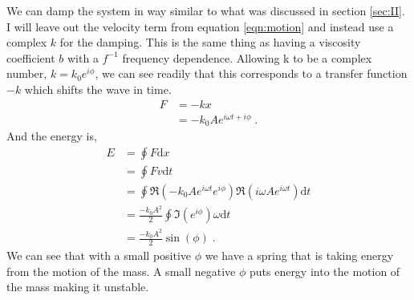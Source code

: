 We can damp the system in way similar to what was discussed in section
\ref{sec:II}. I will leave out the velocity term from equation
\ref{eqn:motion} and instead use a complex $k$ for the damping.
This is the same thing as having a viscosity coefficient $b$ with a $f^{-1}$
frequency dependence.
Allowing k to be a complex number, $k = k_0e^{i\phi}$,
we can see readily that this corresponds to a transfer function $-k$ which
shifts the wave in time.
\begin{align}
F &= -kx \nonumber \\
  &= -k_0Ae^{i\omega t + i\phi} \;.
\end{align}
And the energy is,
\begin{align}
E &= \oint F\mathrm{d}x \nonumber \\
  &= \oint Fv\mathrm{d}t \nonumber \\
  &= \oint \Re\left( -k_0Ae^{i\omega t}e^{i\phi} \right)
    \Re\left( i\omega Ae^{i\omega t} \right) \mathrm{d}t \nonumber \\
  &= \frac{-k_0A^2}{2}\oint \Im\left(e^{i\phi}\right) \omega \mathrm{d}t \nonumber \\
  &= \frac{-k_0A^2}{2}\sin (\phi) \;.
\end{align}
We can see that with a
small positive $\phi$ we have a spring that is taking energy from the motion
of the mass. A small negative $\phi$ puts energy into the motion of the mass
making it unstable.



